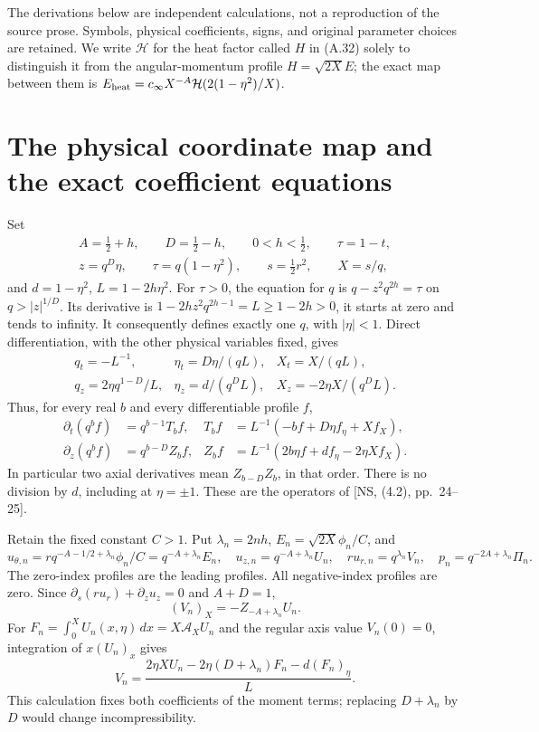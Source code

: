 \documentclass[10pt,a4paper]{article}
\newcommand{\AX}{\mathcal A_X}
\newcommand{\hh}{\mathcal H}
\begin{document}
The derivations below are independent calculations, not a reproduction of the
source prose. Symbols, physical coefficients, signs, and original parameter choices
are retained. We write $\hh$ for the heat factor called $H$ in (A.32) solely to
distinguish it from the angular-momentum profile $H=\sqrt{2X}E$; the exact map
between them is $E_{\rm heat}=c_\infty X^{-A}\hh(2(1-\eta^2)/X)$.

\section{The physical coordinate map and the exact coefficient equations}
Set
\[
\begin{gathered}
 A=\tfrac12+h,\qquad D=\tfrac12-h,\qquad 0<h<\tfrac12,\qquad \tau=1-t,\\
 z=q^D\eta,\qquad \tau=q(1-\eta^2),\qquad s=\tfrac12r^2,\qquad X=s/q,
\end{gathered}
\]
and $d=1-\eta^2$, $L=1-2h\eta^2$. For $\tau>0$, the equation for $q$ is
$q-z^2q^{2h}=\tau$ on $q>|z|^{1/D}$. Its derivative is
$1-2hz^2q^{2h-1}=L\ge1-2h>0$, it starts at zero and tends to infinity.
It consequently defines exactly one $q$, with $|\eta|<1$.
Direct differentiation, with the other physical variables fixed, gives
\[
\begin{array}{lll}
q_t=-L^{-1},&\eta_t=D\eta/(qL),&X_t=X/(qL),\\
q_z=2\eta q^{1-D}/L,&\eta_z=d/(q^DL),&X_z=-2\eta X/(q^DL).
\end{array}
\]
Thus, for every real $b$ and every differentiable profile $f$,
\begin{align*}
 \partial_t(q^bf)&=q^{b-1}T_bf,&
 T_bf&=L^{-1}(-bf+D\eta f_\eta+Xf_X),\\
 \partial_z(q^bf)&=q^{b-D}Z_bf,&
 Z_bf&=L^{-1}(2b\eta f+df_\eta-2\eta Xf_X).
\end{align*}
In particular two axial derivatives mean $Z_{b-D}Z_b$, in that order.
There is no division by $d$, including at $\eta=\pm1$. These are the
operators of [NS, (4.2), pp.~24--25].

Retain the fixed constant $C>1$. Put $\lambda_n=2nh$, $E_n=\sqrt{2X}\phi_n/C$,
and
\[
u_{\theta,n}=rq^{-A-1/2+\lambda_n}\phi_n/C=q^{-A+\lambda_n}E_n,
\quad u_{z,n}=q^{-A+\lambda_n}U_n,\quad
ru_{r,n}=q^{\lambda_n}V_n,\quad p_n=q^{-2A+\lambda_n}\Pi_n.
\]
The zero-index profiles are the leading profiles. All negative-index profiles
are zero. Since $\partial_s(ru_r)+\partial_zu_z=0$ and $A+D=1$,
\[
 (V_n)_X=-Z_{-A+\lambda_n}U_n.
\]
For $F_n=\int_0^XU_n(x,\eta)\,dx=X\AX U_n$ and the regular axis value
$V_n(0)=0$, integration of $x(U_n)_x$ gives
\begin{equation}\label{eq:V}
 V_n=\frac{2\eta XU_n-2\eta(D+\lambda_n)F_n-d(F_n)_\eta}{L}.
\end{equation}
This calculation fixes both coefficients of the moment terms; replacing
$D+\lambda_n$ by $D$ would change incompressibility.
\end{document}
